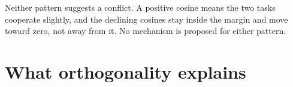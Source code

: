 Neither pattern suggests a conflict. A positive cosine means the two tasks cooperate slightly, and
the declining cosines stay inside the margin and move toward zero, not away from it. No mechanism is
proposed for either pattern.

\section{What orthogonality explains}
\label{apx:cosine:mechanism}

